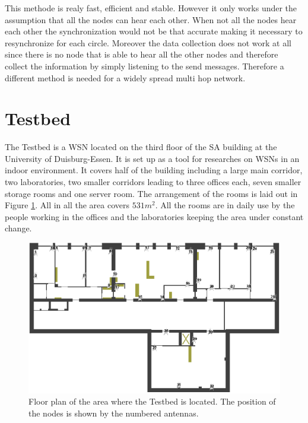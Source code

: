 This methode is realy fast, efficient and stable. However it only works under the assumption that all the nodes can hear each other. When not all the nodes hear each other the synchronization would not be that accurate making it necessary to resynchronize for each circle. Moreover the data collection does not work at all since there is no node that is able to hear all the other nodes and therefore collect the information by simply listening to the send messages.
Therefore a different method is needed for a widely spread multi hop network.

 
\section{Testbed}
The Testbed is a WSN located on the third floor of the SA building at the University of Duisburg-Essen. It is set up as a tool for researches on WSNs in an indoor environment. It covers half of the building including a large main corridor, two laboratories, two smaller corridors leading to three offices each, seven smaller storage rooms and one server room. The arrangement of the rooms is laid out in Figure \ref{fig:testbed}. All in all the area covers $531m^2$. All the rooms are in daily use by the people working in the offices and the laboratories keeping the area under constant change.

\begin{figure}[htbp]
	\centering
    \includegraphics[scale=0.75]{content/images/Testbed}
   	\caption{Floor plan of the area where the Testbed is located. The position of the nodes is shown by the numbered antennas.}
    \label{fig:testbed}
\end{figure}

